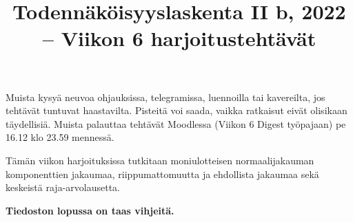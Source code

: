 \documentclass[11pt,a4paper]{amsart}
\title{Todennäköisyyslaskenta II b, 2022 -- Viikon 6 harjoitustehtävät}
\newcommand{\1}{\mathbf{1}}
\begin{document}
\maketitle

Muista kysyä neuvoa ohjauksissa, telegramissa, luennoilla tai kavereilta, jos tehtävät tuntuvat haastavilta. Pisteitä voi saada, vaikka ratkaisut eivät olisikaan täydellisiä.  Muista palauttaa tehtävät Moodlessa (Viikon 6 Digest työpajaan) pe 16.12 klo 23.59 mennessä.

\medskip 

Tämän viikon harjoituksissa tutkitaan moniulotteisen normaalijakauman komponenttien jakaumaa, riippumattomuutta ja ehdollista jakaumaa sekä keskeistä raja-arvolausetta.

 {\bf Tiedoston lopussa on taas vihjeitä.}
\medskip 
\end{document}

